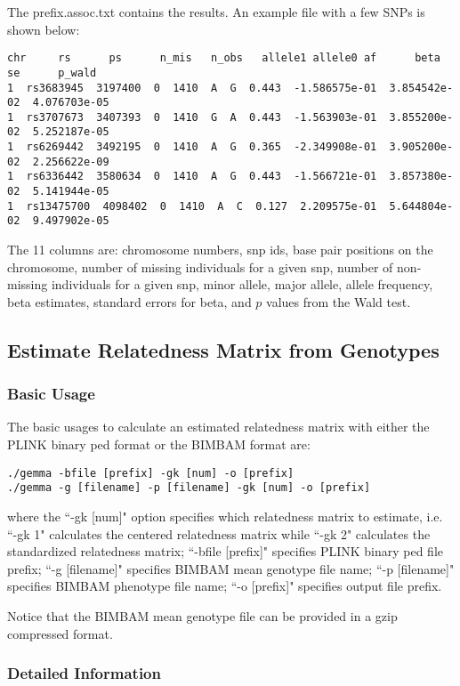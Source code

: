 \documentclass[11pt]{article}
\begin{document}
The prefix.assoc.txt contains the results. An example file with a few SNPs is shown below:
%
\begin{verbatim}
chr     rs      ps      n_mis   n_obs   allele1 allele0 af      beta    se      p_wald
1  rs3683945  3197400  0  1410  A  G  0.443  -1.586575e-01  3.854542e-02  4.076703e-05
1  rs3707673  3407393  0  1410  G  A  0.443  -1.563903e-01  3.855200e-02  5.252187e-05
1  rs6269442  3492195  0  1410  A  G  0.365  -2.349908e-01  3.905200e-02  2.256622e-09
1  rs6336442  3580634  0  1410  A  G  0.443  -1.566721e-01  3.857380e-02  5.141944e-05
1  rs13475700  4098402  0  1410  A  C  0.127  2.209575e-01  5.644804e-02  9.497902e-05
\end{verbatim}
%

The 11 columns are: chromosome numbers, snp ids, base pair positions on the chromosome, number of missing individuals for a given snp, number of non-missing individuals for a given snp, minor allele, major allele, allele frequency, beta estimates, standard errors for beta, and $p$ values from the Wald test. 



\subsection{Estimate Relatedness Matrix from Genotypes}
\subsubsection{Basic Usage}
The basic usages to calculate an estimated relatedness matrix with either the PLINK binary ped format or the BIMBAM format are:
%
\begin{verbatim}
./gemma -bfile [prefix] -gk [num] -o [prefix]
./gemma -g [filename] -p [filename] -gk [num] -o [prefix]
\end{verbatim}
%
where the ``-gk [num]" option specifies which relatedness matrix to estimate, i.e. ``-gk 1" calculates the centered relatedness matrix while ``-gk 2" calculates the standardized relatedness matrix; ``-bfile [prefix]" specifies PLINK binary ped file prefix; ``-g [filename]" specifies BIMBAM mean genotype file name; ``-p [filename]" specifies BIMBAM phenotype file name; ``-o [prefix]" specifies output file prefix. 

Notice that the BIMBAM mean genotype file can be provided in a gzip compressed format.

\subsubsection{Detailed Information}
\end{document}
